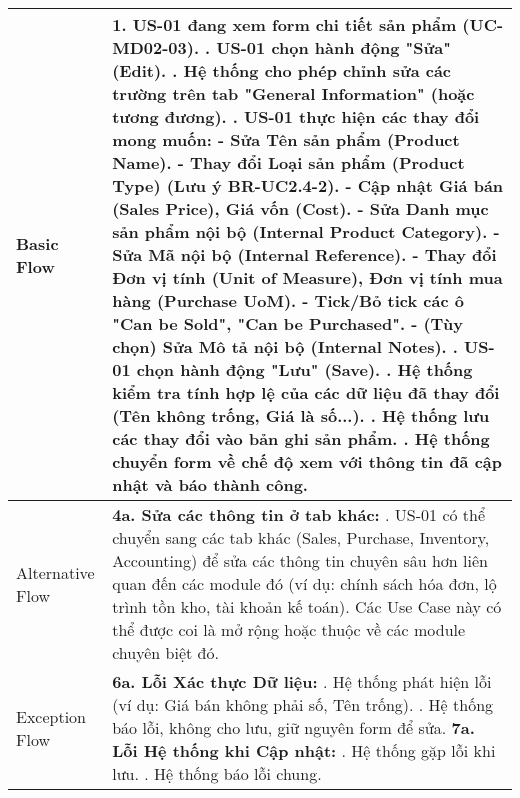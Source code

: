 \begin{longtable}{|m{4cm}|p{11cm}|}
Basic Flow & 1. US-01 đang xem form chi tiết sản phẩm (UC-MD02-03). \newline 2. US-01 chọn hành động "Sửa" (Edit). \newline 3. Hệ thống cho phép chỉnh sửa các trường trên tab "General Information" (hoặc tương đương). \newline 4. US-01 thực hiện các thay đổi mong muốn: \newline    - Sửa Tên sản phẩm (Product Name). \newline    - Thay đổi Loại sản phẩm (Product Type) (Lưu ý BR-UC2.4-2). \newline    - Cập nhật Giá bán (Sales Price), Giá vốn (Cost). \newline    - Sửa Danh mục sản phẩm nội bộ (Internal Product Category). \newline    - Sửa Mã nội bộ (Internal Reference). \newline    - Thay đổi Đơn vị tính (Unit of Measure), Đơn vị tính mua hàng (Purchase UoM). \newline    - Tick/Bỏ tick các ô "Can be Sold", "Can be Purchased". \newline    - (Tùy chọn) Sửa Mô tả nội bộ (Internal Notes). \newline 5. US-01 chọn hành động "Lưu" (Save). \newline 6. Hệ thống kiểm tra tính hợp lệ của các dữ liệu đã thay đổi (Tên không trống, Giá là số...). \newline 7. Hệ thống lưu các thay đổi vào bản ghi sản phẩm. \newline 8. Hệ thống chuyển form về chế độ xem với thông tin đã cập nhật và báo thành công. \\
\hline
Alternative Flow & \textbf{4a. Sửa các thông tin ở tab khác:} \newline    1. US-01 có thể chuyển sang các tab khác (Sales, Purchase, Inventory, Accounting) để sửa các thông tin chuyên sâu hơn liên quan đến các module đó (ví dụ: chính sách hóa đơn, lộ trình tồn kho, tài khoản kế toán). Các Use Case này có thể được coi là mở rộng hoặc thuộc về các module chuyên biệt đó. \\
\hline
Exception Flow & \textbf{6a. Lỗi Xác thực Dữ liệu:} \newline    1. Hệ thống phát hiện lỗi (ví dụ: Giá bán không phải số, Tên trống). \newline    2. Hệ thống báo lỗi, không cho lưu, giữ nguyên form để sửa. \newline \textbf{7a. Lỗi Hệ thống khi Cập nhật:} \newline    1. Hệ thống gặp lỗi khi lưu. \newline    2. Hệ thống báo lỗi chung. \\

\end{longtable}
